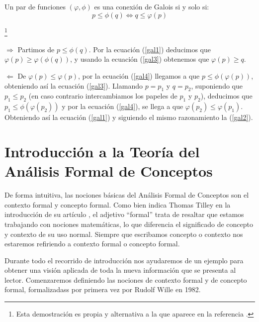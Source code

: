\documentclass[oneside,openright,titlepage,numbers=noenddot,openany,headinclude,footinclude=true,
cleardoublepage=empty,abstractoff,BCOR=5mm,paper=a4,fontsize=12pt,main=spanish]{scrreprt}
\begin{document}
\begin{proposition}\cite{gierz_compendium_1980} Un par de funciones $(\varphi,\phi)$ es una conexión de Galois si y solo si:
\begin{equation}\label{gal4}
p \leq \phi (q) \Longleftrightarrow q\leq \varphi (p)
\end{equation}

\end{proposition}
\begin{proofs}\footnote{Esta demostración es propia y alternativa a la que aparece en la referencia \cite{gierz_compendium_1980}.}

$\boxed{\Longrightarrow}$ Partimos de $p \leq \phi (q)$. Por la ecuación (\ref{gal1}) deducimos que $\varphi (p) \geq \varphi (\phi (q))$, y usando la ecuación (\ref{gal3}) obtenemos que $\varphi (p) \geq q$.

$\boxed{\Longleftarrow}$ De $ \varphi (p) \leq \varphi (p)$, por la ecuación (\ref{gal4}) llegamos a que $p \leq \phi (\varphi (p))$, obteniendo así la ecuación (\ref{gal3}). Llamando $p=p_1$ y $q=p_2$, suponiendo que $p_1 \leq p_2$ (en caso contrario intercambiamos los papeles de $p_1$ y $p_2$), deducimos que $p_1 \leq \phi (\varphi (p_2))$ y por la ecuación (\ref{gal4}), se llega a que $\varphi (p_2) \leq \varphi (p_1)$. Obteniendo así la ecuación (\ref{gal1}) y siguiendo el mismo razonamiento la (\ref{gal2}).

\end{proofs}


\chapter{Introducción a la Teoría del Análisis Formal de Conceptos}
   \label{chap:3}

De forma intuitiva, las nociones básicas del Análisis Formal de Conceptos son el contexto formal y concepto formal. Como bien indica Thomas Tilley en la introducción de su artículo \cite{tilley}, el adjetivo ``formal'' trata de resaltar que estamos trabajando con nociones matemáticas, lo que diferencia el significado de concepto y contexto de su uso normal. Siempre que escribamos concepto o contexto nos estaremos refiriendo a contexto formal o concepto formal. 

Durante todo el recorrido de introducción nos ayudaremos de un ejemplo para obtener una visión aplicada de toda la nueva información que se presenta al lector. Comenzaremos definiendo las nociones de contexto formal y de concepto formal, formalizadass por primera vez por Rudolf Wille en 1982.
\end{document}
